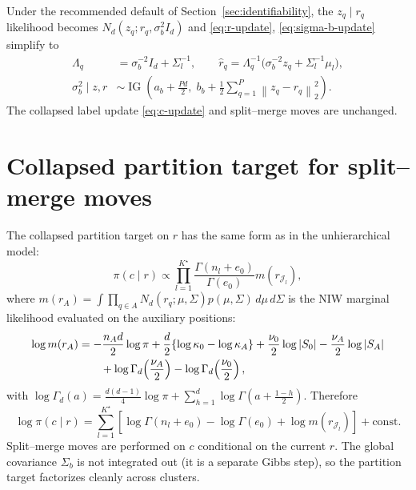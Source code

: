 \documentclass[11pt]{article}
\newcommand{\norm}[1]{\left\lVert #1 \right\rVert}
\DeclareMathOperator{\IG}{IG}
\begin{document}
Under the recommended default of Section~\ref{sec:identifiability}, the
$z_q\mid r_q$ likelihood becomes $N_d(z_q;r_q,\sigma_b^2 I_d)$ and
\eqref{eq:r-update}, \eqref{eq:sigma-b-update} simplify to
\begin{align}
    \Lambda_q&=\sigma_b^{-2}I_d+\Sigma_{l}^{-1},
    \qquad
    \widehat r_q=\Lambda_q^{-1}\bigl(\sigma_b^{-2}z_q+\Sigma_{l}^{-1}\mu_l\bigr),\\
    \sigma_b^2\mid z,r&\sim\IG\!\left(a_b+\tfrac{Pd}{2},\;
    b_b+\tfrac{1}{2}\sum_{q=1}^{P}\norm{z_q-r_q}_2^2\right).
    \label{eq:sigma-b-scalar-update}
\end{align}
The collapsed label update \eqref{eq:c-update} and split--merge moves are
unchanged.

\section{Collapsed partition target for split--merge moves}

The collapsed partition target on $r$ has the same form as in the
unhierarchical model:
\begin{equation}
    \pi(c\mid r)
    \propto
    \prod_{l=1}^{K^\star}
    \frac{\Gamma(n_l+e_0)}{\Gamma(e_0)}
    m(r_{\mathcal J_l}),
    \label{eq:collapsed-partition-target}
\end{equation}
where $m(r_A)=\int\prod_{q\in A}N_d(r_q;\mu,\Sigma)p(\mu,\Sigma)\,d\mu\,d\Sigma$
is the NIW marginal likelihood evaluated on the auxiliary positions:
\begin{align}
    \log m(r_A)
    &=-\frac{n_Ad}{2}\log\pi
    +\frac{d}{2}\{\log\kappa_0-\log\kappa_A\}
    +\frac{\nu_0}{2}\log|S_0|
    -\frac{\nu_A}{2}\log|S_A|
    \notag\\
    &\qquad+\log\Gamma_d\!\left(\frac{\nu_A}{2}\right)
    -\log\Gamma_d\!\left(\frac{\nu_0}{2}\right),
    \label{eq:niw-marginal}
\end{align}
with $\log\Gamma_d(a)=\frac{d(d-1)}{4}\log\pi+\sum_{h=1}^d\log\Gamma\!\left(a+\frac{1-h}{2}\right)$.
Therefore
\begin{equation}
    \log\pi(c\mid r)
    =
    \sum_{l=1}^{K^\star}
    \!\left[\log\Gamma(n_l+e_0)-\log\Gamma(e_0)
    +\log m(r_{\mathcal J_l})\right]+\mathrm{const}.
    \label{eq:log-collapsed-partition-target}
\end{equation}
Split--merge moves are performed on $c$ conditional on the current $r$.
The global covariance $\Sigma_b$ is not integrated out (it is a separate
Gibbs step), so the partition target factorizes cleanly across clusters.
\end{document}
